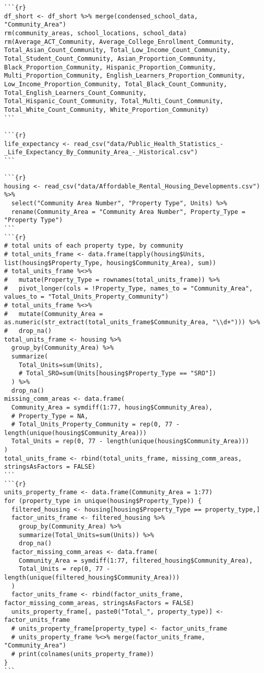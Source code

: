 \documentclass{article}
\begin{document}
\begin{verbatim}
```{r}
df_short <- df_short %>% merge(condensed_school_data, "Community_Area")
rm(community_areas, school_locations, school_data)
rm(Average_ACT_Community, Average_College_Enrollment_Community, Total_Asian_Count_Community, Total_Low_Income_Count_Community, Total_Student_Count_Community, Asian_Proportion_Community, Black_Proportion_Community, Hispanic_Proportion_Community, Multi_Proportion_Community, English_Learners_Proportion_Community, Low_Income_Proportion_Community, Total_Black_Count_Community, Total_English_Learners_Count_Community, Total_Hispanic_Count_Community, Total_Multi_Count_Community, Total_White_Count_Community, White_Proportion_Community)
```

```{r}
life_expectancy <- read_csv("data/Public_Health_Statistics_-_Life_Expectancy_By_Community_Area_-_Historical.csv")
```

```{r}
housing <- read_csv("data/Affordable_Rental_Housing_Developments.csv") %>%
  select("Community Area Number", "Property Type", Units) %>%
  rename(Community_Area = "Community Area Number", Property_Type = "Property Type")
```
```{r}
# total units of each property type, by community
# total_units_frame <- data.frame(tapply(housing$Units, list(housing$Property_Type, housing$Community_Area), sum))
# total_units_frame %<>%
#   mutate(Property_Type = rownames(total_units_frame)) %>%
#   pivot_longer(cols = !Property_Type, names_to = "Community_Area", values_to = "Total_Units_Property_Community")
# total_units_frame %<>%
#   mutate(Community_Area = as.numeric(str_extract(total_units_frame$Community_Area, "\\d+"))) %>%
#   drop_na()
total_units_frame <- housing %>%
  group_by(Community_Area) %>%
  summarize(
    Total_Units=sum(Units),
    # Total_SRO=sum(Units[housing$Property_Type == "SRO"])
  ) %>%
  drop_na()
missing_comm_areas <- data.frame(
  Community_Area = symdiff(1:77, housing$Community_Area),
  # Property_Type = NA,
  # Total_Units_Property_Community = rep(0, 77 - length(unique(housing$Community_Area)))
  Total_Units = rep(0, 77 - length(unique(housing$Community_Area)))
)
total_units_frame <- rbind(total_units_frame, missing_comm_areas, stringsAsFactors = FALSE)
```
```{r}
units_property_frame <- data.frame(Community_Area = 1:77)
for (property_type in unique(housing$Property_Type)) {
  filtered_housing <- housing[housing$Property_Type == property_type,]
  factor_units_frame <- filtered_housing %>%
    group_by(Community_Area) %>%
    summarize(Total_Units=sum(Units)) %>%
    drop_na()
  factor_missing_comm_areas <- data.frame(
    Community_Area = symdiff(1:77, filtered_housing$Community_Area),
    Total_Units = rep(0, 77 - length(unique(filtered_housing$Community_Area)))
  )
  factor_units_frame <- rbind(factor_units_frame, factor_missing_comm_areas, stringsAsFactors = FALSE)
  units_property_frame[, paste0("Total_", property_type)] <- factor_units_frame
  # units_property_frame[property_type] <- factor_units_frame
  # units_property_frame %<>% merge(factor_units_frame, "Community_Area")
  # print(colnames(units_property_frame))
}
```


\end{verbatim}
\end{document}
